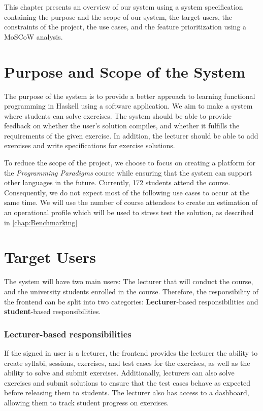 This chapter presents an overview of our system using a system specification containing the purpose and the scope of our system, the target users, the constraints of the project, the use cases, and the feature prioritization using a MoSCoW analysis.

\section*{Purpose and Scope of the System}
The purpose of the system is to provide a better approach to learning functional programming in Haskell using a software application.
We aim to make a system where students can solve exercises. The system should be able to provide feedback on whether the user's solution compiles, and whether it fulfills the requirements of the given exercise.
In addition, the lecturer should be able to add exercises and write specifications for exercise solutions.

To reduce the scope of the project, we choose to focus on creating a platform for the \textit{Programming Paradigms} course while ensuring that the system can support other languages in the future.
Currently, 172 students attend the course.
Consequently, we do not expect most of the following use cases to occur at the same time.
We will use the number of course attendees to create an estimation of an operational profile which will be used to stress test the solution, as described in \ref{chap:Benchmarking}

\section*{Target Users}
The system will have two main users: The lecturer that will conduct the course, and the university students enrolled in the course.
Therefore, the responsibility of the frontend can be split into two categories: \textbf{Lecturer}-based responsibilities and \textbf{student}-based responsibilities.

\subsubsection*{Lecturer-based responsibilities}
If the signed in user is a lecturer, the frontend provides the lecturer the ability to create syllabi, sessions, exercises, and test cases for the exercises, as well as the ability to solve and submit exercises. Additionally, lecturers can also solve exercises and submit solutions to ensure that the test cases behave as expected before releasing them to students.
The lecturer also has access to a dashboard, allowing them to track student progress on exercises.

